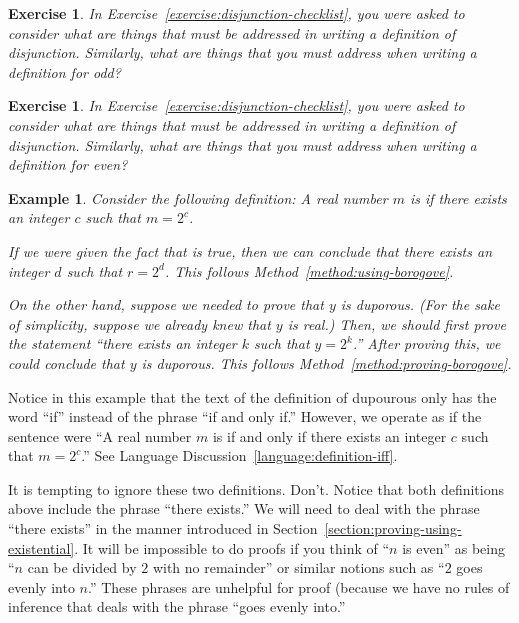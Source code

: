 \documentclass{book}
\newcounter{ekcounter}%
\theoremstyle{ekimcustom}
\newtheorem{example}[ekcounter]{Example}
\newtheorem{exercise}[ekcounter]{Exercise}
\newcommand\defn[1]{{\color{blue}{\bf #1}}}
\begin{document}
\begin{exercise}
In Exercise~\ref{exercise:disjunction-checklist}, you were asked to consider what are things that must be addressed in writing a definition of disjunction. Similarly, what are things that you must address when writing a definition for odd?
\end{exercise}
\begin{exercise}
In Exercise~\ref{exercise:disjunction-checklist}, you were asked to consider what are things that must be addressed in writing a definition of disjunction. Similarly, what are things that you must address when writing a definition for even?
\end{exercise}

\begin{example}
Consider the following definition: A real number $m$ is \defn{duporous} if there exists an integer $c$ such that $m=2^c$.

If we were given the fact that  is true, then we can conclude that there exists an integer $d$ such that $r=2^d$. This follows Method~\ref{method:using-borogove}.

On the other hand, suppose we needed to prove that $y$ is duporous. (For the sake of simplicity, suppose we already knew that $y$ is real.) Then, we should first prove the statement ``there exists an integer $k$ such that $y=2^k$.'' After proving this, we could conclude that $y$ is duporous.  This follows Method~\ref{method:proving-borogove}.
\end{example}
Notice in this example that the text of the definition of dupourous only has the word ``if'' instead of the phrase ``if and only if.'' However, we operate as if the sentence were ``A real number $m$ is \defn{duporous} if and only if there exists an integer $c$ such that $m=2^c$.'' See Language Discussion~\ref{language:definition-iff}.

\begin{bwarning}{}{}
It is tempting to ignore these two definitions. Don't. Notice that both definitions above include the phrase ``there exists.'' We will need to deal with the phrase ``there exists'' in the manner introduced in Section~\ref{section:proving-using-existential}. It will be impossible to do proofs if you think of ``$n$ is even'' as being ``$n$ can be divided by $2$ with no remainder'' or similar notions such as ``$2$ goes evenly into $n$.'' These phrases are unhelpful for proof (because we have no rules of inference that deals with the phrase ``goes evenly into.''
\end{bwarning}
\end{document}
